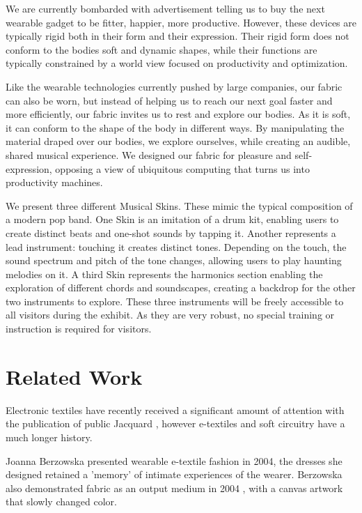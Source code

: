 \documentclass{sigchi-ext}
\begin{document}
We are currently bombarded with advertisement telling us to buy the next wearable gadget to be fitter, happier, more productive. However, these devices are typically rigid both in their form and their expression. Their rigid form does not conform to the bodies soft and dynamic shapes, while their functions are typically constrained by a world view focused on productivity and optimization.

Like the wearable technologies currently pushed by large companies, our fabric can also be worn, but instead of helping us to reach our next goal faster and more efficiently, our fabric invites us to rest and explore our bodies. As it is soft, it can conform to the shape of the body in different ways. By manipulating the material draped over our bodies, we explore ourselves, while creating an audible, shared musical experience. We designed our fabric for pleasure and self-expression, opposing a view of ubiquitous computing that turns us into productivity machines.

We present three different Musical Skins. These mimic the typical composition of a modern pop band. One Skin is an imitation of a drum kit, enabling users to create distinct beats and one-shot sounds by tapping it. Another represents a lead instrument: touching it creates distinct tones. Depending on the touch, the sound spectrum and pitch of the tone changes, allowing users to play haunting melodies on it. A third Skin represents the harmonics section enabling the exploration of different chords and soundscapes, creating a backdrop for the other two instruments to explore. These three instruments will be freely accessible to all visitors during the exhibit. As they are very robust, no special training or instruction is required for visitors.


\section{Related Work}
Electronic textiles have recently received a significant amount of attention with the publication of public Jacquard \cite{jacquard}, however e-textiles and soft circuitry have a much longer history.

Joanna Berzowska presented wearable e-textile fashion in 2004\cite{berzowska:04}, the dresses she designed retained a 'memory' of intimate experiences of the wearer. Berzowska also demonstrated fabric as an output medium in 2004 \cite{berzowska:05} , with a canvas artwork that slowly changed color.
\end{document}
